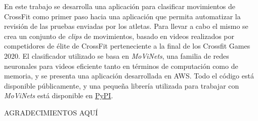 En este trabajo se desarrolla una aplicación para clasificar movimientos de CrossFit como primer paso hacia una aplicación que permita automatizar la revisión de las pruebas enviadas por los atletas. Para llevar a cabo el mismo se crea un conjunto de \textit{clips} de movimientos, basado en videos realizados por competidores de élite de CrossFit perteneciente a la final de los Crossfit Games 2020. El clasificador utilizado se basa en \textit{MoViNets}, una familia de redes neuronales para videos eficiente tanto en términos de computación como de memoria, y se presenta una aplicación desarrollada en AWS. Todo el código está disponible públicamente, y una pequeña librería utilizada para trabajar con \textit{MoViNets} está disponible en \href{https://pypi.org/project/movinets_helper/}{PyPI}.



\clearpage
\thispagestyle{plain}
\begin{center}
\Large{}
\end{center}
\vskip1cm

AGRADECIMIENTOS AQUÍ

